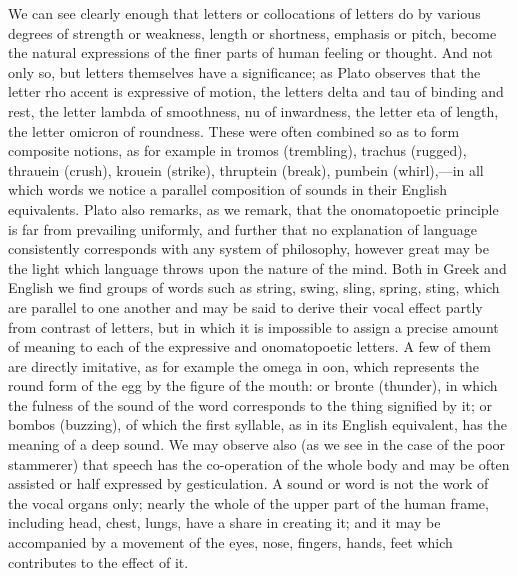 \documentclass[11pt,letter]{article}
\begin{document}
\par  We can see clearly enough that letters or collocations of letters do by various degrees of strength or weakness, length or shortness, emphasis or pitch, become the natural expressions of the finer parts of human feeling or thought. And not only so, but letters themselves have a significance; as Plato observes that the letter rho accent is expressive of motion, the letters delta and tau of binding and rest, the letter lambda of smoothness, nu of inwardness, the letter eta of length, the letter omicron of roundness. These were often combined so as to form composite notions, as for example in tromos (trembling), trachus (rugged), thrauein (crush), krouein (strike), thruptein (break), pumbein (whirl),—in all which words we notice a parallel composition of sounds in their English equivalents. Plato also remarks, as we remark, that the onomatopoetic principle is far from prevailing uniformly, and further that no explanation of language consistently corresponds with any system of philosophy, however great may be the light which language throws upon the nature of the mind. Both in Greek and English we find groups of words such as string, swing, sling, spring, sting, which are parallel to one another and may be said to derive their vocal effect partly from contrast of letters, but in which it is impossible to assign a precise amount of meaning to each of the expressive and onomatopoetic letters. A few of them are directly imitative, as for example the omega in oon, which represents the round form of the egg by the figure of the mouth: or bronte (thunder), in which the fulness of the sound of the word corresponds to the thing signified by it; or bombos (buzzing), of which the first syllable, as in its English equivalent, has the meaning of a deep sound. We may observe also (as we see in the case of the poor stammerer) that speech has the co-operation of the whole body and may be often assisted or half expressed by gesticulation. A sound or word is not the work of the vocal organs only; nearly the whole of the upper part of the human frame, including head, chest, lungs, have a share in creating it; and it may be accompanied by a movement of the eyes, nose, fingers, hands, feet which contributes to the effect of it.
\end{document}
